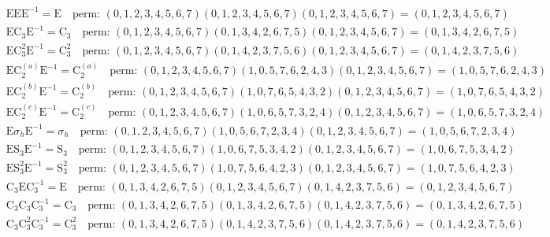 \begin{align*}
& \mathrm{E} \mathrm{E} \mathrm{E}^{-1} = \mathrm{E} \quad \text{perm: }(0, 1, 2, 3, 4, 5, 6, 7)(0, 1, 2, 3, 4, 5, 6, 7)(0, 1, 2, 3, 4, 5, 6, 7) = (0, 1, 2, 3, 4, 5, 6, 7) \\
& \mathrm{E} \mathrm{C}_{3} \mathrm{E}^{-1} = \mathrm{C}_{3} \quad \text{perm: }(0, 1, 2, 3, 4, 5, 6, 7)(0, 1, 3, 4, 2, 6, 7, 5)(0, 1, 2, 3, 4, 5, 6, 7) = (0, 1, 3, 4, 2, 6, 7, 5) \\
& \mathrm{E} \mathrm{C}_{3}^{2} \mathrm{E}^{-1} = \mathrm{C}_{3}^{2} \quad \text{perm: }(0, 1, 2, 3, 4, 5, 6, 7)(0, 1, 4, 2, 3, 7, 5, 6)(0, 1, 2, 3, 4, 5, 6, 7) = (0, 1, 4, 2, 3, 7, 5, 6) \\
& \mathrm{E} \mathrm{C}_{2}^{(a)} \mathrm{E}^{-1} = \mathrm{C}_{2}^{(a)} \quad \text{perm: }(0, 1, 2, 3, 4, 5, 6, 7)(1, 0, 5, 7, 6, 2, 4, 3)(0, 1, 2, 3, 4, 5, 6, 7) = (1, 0, 5, 7, 6, 2, 4, 3) \\
& \mathrm{E} \mathrm{C}_{2}^{(b)} \mathrm{E}^{-1} = \mathrm{C}_{2}^{(b)} \quad \text{perm: }(0, 1, 2, 3, 4, 5, 6, 7)(1, 0, 7, 6, 5, 4, 3, 2)(0, 1, 2, 3, 4, 5, 6, 7) = (1, 0, 7, 6, 5, 4, 3, 2) \\
& \mathrm{E} \mathrm{C}_{2}^{(c)} \mathrm{E}^{-1} = \mathrm{C}_{2}^{(c)} \quad \text{perm: }(0, 1, 2, 3, 4, 5, 6, 7)(1, 0, 6, 5, 7, 3, 2, 4)(0, 1, 2, 3, 4, 5, 6, 7) = (1, 0, 6, 5, 7, 3, 2, 4) \\
& \mathrm{E} \sigma_{h} \mathrm{E}^{-1} = \sigma_{h} \quad \text{perm: }(0, 1, 2, 3, 4, 5, 6, 7)(1, 0, 5, 6, 7, 2, 3, 4)(0, 1, 2, 3, 4, 5, 6, 7) = (1, 0, 5, 6, 7, 2, 3, 4) \\
& \mathrm{E} \mathrm{S}_{3} \mathrm{E}^{-1} = \mathrm{S}_{3} \quad \text{perm: }(0, 1, 2, 3, 4, 5, 6, 7)(1, 0, 6, 7, 5, 3, 4, 2)(0, 1, 2, 3, 4, 5, 6, 7) = (1, 0, 6, 7, 5, 3, 4, 2) \\
& \mathrm{E} \mathrm{S}_{3}^{2} \mathrm{E}^{-1} = \mathrm{S}_{3}^{2} \quad \text{perm: }(0, 1, 2, 3, 4, 5, 6, 7)(1, 0, 7, 5, 6, 4, 2, 3)(0, 1, 2, 3, 4, 5, 6, 7) = (1, 0, 7, 5, 6, 4, 2, 3) \\
& \mathrm{C}_{3} \mathrm{E} \mathrm{C}_{3}^{-1} = \mathrm{E} \quad \text{perm: }(0, 1, 3, 4, 2, 6, 7, 5)(0, 1, 2, 3, 4, 5, 6, 7)(0, 1, 4, 2, 3, 7, 5, 6) = (0, 1, 2, 3, 4, 5, 6, 7) \\
& \mathrm{C}_{3} \mathrm{C}_{3} \mathrm{C}_{3}^{-1} = \mathrm{C}_{3} \quad \text{perm: }(0, 1, 3, 4, 2, 6, 7, 5)(0, 1, 3, 4, 2, 6, 7, 5)(0, 1, 4, 2, 3, 7, 5, 6) = (0, 1, 3, 4, 2, 6, 7, 5) \\
& \mathrm{C}_{3} \mathrm{C}_{3}^{2} \mathrm{C}_{3}^{-1} = \mathrm{C}_{3}^{2} \quad \text{perm: }(0, 1, 3, 4, 2, 6, 7, 5)(0, 1, 4, 2, 3, 7, 5, 6)(0, 1, 4, 2, 3, 7, 5, 6) = (0, 1, 4, 2, 3, 7, 5, 6) \\

\end{align*}
